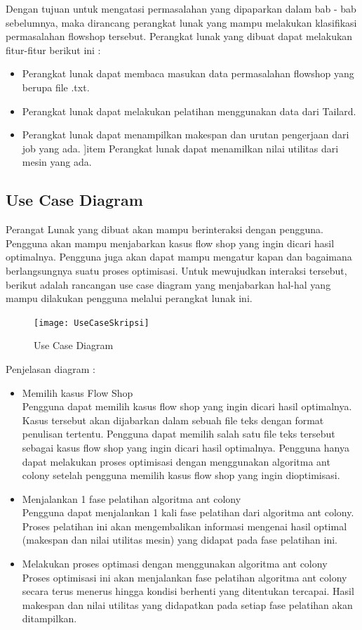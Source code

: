 	Dengan tujuan untuk mengatasi permasalahan yang dipaparkan dalam bab - bab sebelumnya, maka dirancang perangkat
	lunak yang mampu melakukan klasifikasi permasalahan flowshop tersebut. Perangkat lunak
	yang dibuat dapat melakukan fitur-fitur berikut ini :
	\begin{itemize}
		\item Perangkat lunak dapat membaca masukan data permasalahan flowshop yang berupa file .txt.
		\item Perangkat lunak dapat melakukan pelatihan menggunakan data dari Tailard.
		\item Perangkat lunak dapat menampilkan makespan dan urutan pengerjaan dari job yang ada.
		]item Perangkat lunak dapat menamilkan nilai utilitas dari mesin yang ada.
	\end{itemize}

	\newpage
	\subsection{Use Case Diagram}
	
	Perangat Lunak yang dibuat akan mampu berinteraksi dengan pengguna. Pengguna akan mampu
	menjabarkan kasus flow shop yang ingin dicari hasil optimalnya. Pengguna juga akan dapat
	mampu mengatur kapan dan bagaimana berlangsungnya suatu proses optimisasi. Untuk mewujudkan
	interaksi tersebut, berikut adalah rancangan use case diagram yang menjabarkan hal-hal
	yang mampu dilakukan pengguna melalui perangkat lunak ini.
	\begin{figure}[H]
		\centering
		\texttt{[image: UseCaseSkripsi]}
		\caption[Use Case Diagram]{Use Case Diagram}
		\label{fig:usecasediagram}
	\end{figure}
	Penjelasan diagram :
	\begin{itemize}
		\item Memilih kasus Flow Shop\\
		Pengguna dapat memilih kasus flow shop yang ingin dicari hasil optimalnya. Kasus
		tersebut akan dijabarkan dalam sebuah file teks dengan format penulisan tertentu. Pengguna
		dapat memilih salah satu file teks tersebut sebagai kasus flow shop yang ingin dicari
		hasil optimalnya. Pengguna hanya dapat melakukan proses optimisasi dengan menggunakan
		algoritma ant colony setelah pengguna memilih kasus flow shop yang ingin dioptimisasi.
		\item Menjalankan 1 fase pelatihan algoritma ant colony\\
		Pengguna dapat menjalankan 1 kali fase pelatihan dari algoritma ant colony. Proses pelatihan
		ini akan mengembalikan informasi mengenai hasil optimal (makespan dan nilai utilitas mesin) yang 
		didapat pada fase pelatihan	ini.
		\item Melakukan proses optimasi dengan menggunakan algoritma ant colony\\
		Proses optimisasi ini akan menjalankan fase pelatihan algoritma ant colony secara terus 
		menerus hingga kondisi berhenti yang ditentukan tercapai. Hasil makespan dan nilai utilitas yang
		didapatkan pada setiap fase pelatihan akan ditampilkan.
	\end{itemize}
	
